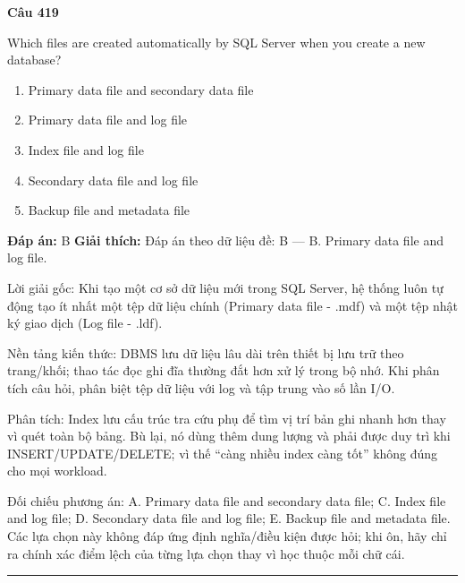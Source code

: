 \documentclass[11pt,a4paper]{article}
\newenvironment{question}[1]{%
  \par\vspace{1em}\noindent\textbf{\large Câu #1}\par\vspace{0.4em}
}{%
  \par\vspace{1em}\hrule\vspace{0.6em}
}
\newenvironment{choices}{%
  \begin{enumerate}[label=\textbf{\Alph*.},leftmargin=2.2em,itemsep=2pt,topsep=3pt]
}{%
  \end{enumerate}
}
\newcommand{\choice}{\item}
\begin{document}
\begin{question}{419}
Which files are created automatically by SQL Server when you create a new database?
\begin{choices}
\choice Primary data file and secondary data file
\choice Primary data file and log file
\choice Index file and log file
\choice Secondary data file and log file
\choice Backup file and metadata file
\end{choices}
\textbf{Đáp án:} B
\textbf{Giải thích:} Đáp án theo dữ liệu đề: B — B. Primary data file and log file.

Lời giải gốc: Khi tạo một cơ sở dữ liệu mới trong SQL Server, hệ thống luôn tự động tạo ít nhất một tệp dữ liệu chính (Primary data file - .mdf) và một tệp nhật ký giao dịch (Log file - .ldf).

Nền tảng kiến thức: DBMS lưu dữ liệu lâu dài trên thiết bị lưu trữ theo trang/khối; thao tác đọc ghi đĩa thường đắt hơn xử lý trong bộ nhớ. Khi phân tích câu hỏi, phân biệt tệp dữ liệu với log và tập trung vào số lần I/O.

Phân tích: Index lưu cấu trúc tra cứu phụ để tìm vị trí bản ghi nhanh hơn thay vì quét toàn bộ bảng. Bù lại, nó dùng thêm dung lượng và phải được duy trì khi INSERT/UPDATE/DELETE; vì thế “càng nhiều index càng tốt” không đúng cho mọi workload.

Đối chiếu phương án: A. Primary data file and secondary data file; C. Index file and log file; D. Secondary data file and log file; E. Backup file and metadata file. Các lựa chọn này không đáp ứng định nghĩa/điều kiện được hỏi; khi ôn, hãy chỉ ra chính xác điểm lệch của từng lựa chọn thay vì học thuộc mỗi chữ cái.
\end{question}
\end{document}
